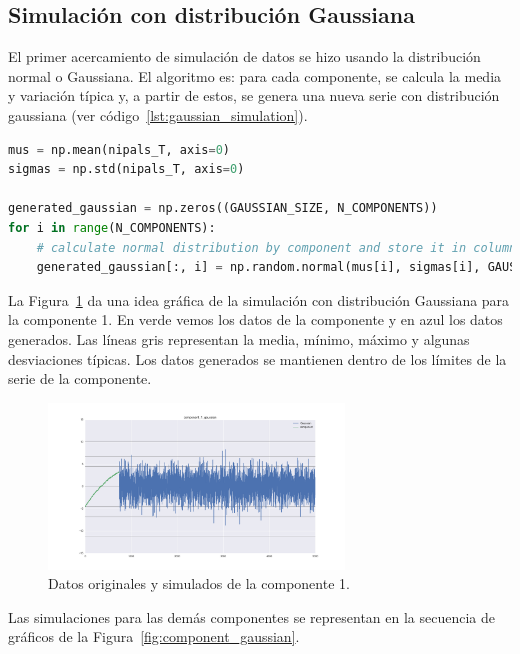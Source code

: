 \documentclass[11pt,spanish,listoffigures,listoftables]{tfgetsinf}
\begin{document}
    \subsection{Simulación con distribución Gaussiana}
    El primer acercamiento de simulación de datos se hizo usando la distribución normal o Gaussiana. El algoritmo es: para cada componente, se calcula la media y variación típica y, a partir de estos, se genera una nueva serie con distribución gaussiana (ver código~\ref{lst:gaussian_simulation}).
    
    \begin{lstlisting}[language=Python, caption=Simulación con distribución Gaussiana., label={lst:gaussian_simulation}]
mus = np.mean(nipals_T, axis=0)
sigmas = np.std(nipals_T, axis=0)

generated_gaussian = np.zeros((GAUSSIAN_SIZE, N_COMPONENTS))
for i in range(N_COMPONENTS):
    # calculate normal distribution by component and store it in column i
    generated_gaussian[:, i] = np.random.normal(mus[i], sigmas[i], GAUSSIAN_SIZE)
    \end{lstlisting}
    
    La Figura~\ref{fig:component_0_gaussian} da una idea gráfica de la simulación con distribución Gaussiana para la componente 1. En verde vemos los datos de la componente y en azul los datos generados. Las líneas gris representan la media, mínimo, máximo y algunas desviaciones típicas. Los datos generados se mantienen dentro de los límites de la serie de la componente.

    \begin{figure}[H]
        \centering
        \includegraphics[width=0.7\textwidth]{component_1_gaussian.png}
        \caption{Datos originales y simulados de la componente 1.}
        \label{fig:component_0_gaussian}
    \end{figure}   
    
    Las simulaciones para las demás componentes se representan en la secuencia de gráficos de la Figura~\ref{fig:component_gaussian}.
    
\end{document}
